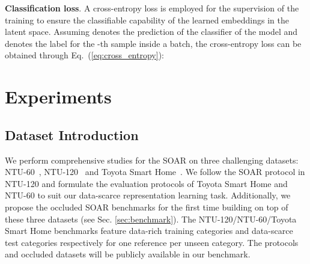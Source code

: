 \documentclass[lettersize,journal]{IEEEtran}
\newcommand{\mypar}[1]{\vspace{0.1cm}\noindent\textbf{#1}.}
\begin{document}
\mypar{Classification loss}
A cross-entropy loss is employed for the supervision of the training to ensure the classifiable capability of the learned embeddings in the latent space. Assuming  denotes the prediction of the classifier of the model and  denotes the label for the -th sample inside a batch, the cross-entropy loss can be obtained through Eq.~(\ref{eq:cross_entropy}):







 
\section{Experiments}
\subsection{Dataset Introduction}
We perform comprehensive studies for the SOAR on three challenging datasets: NTU-60~\cite{shahroudy2016ntu}, NTU-120~\cite{liu2019ntu} and Toyota Smart Home~\cite{Das_2019_ICCV}.
We follow the SOAR protocol in NTU-120 and formulate the evaluation protocols of Toyota Smart Home and NTU-60 to suit our data-scarce representation learning task. Additionally, we propose the occluded SOAR benchmarks for the first time building on top of these three datasets (see Sec. \ref{sec:benchmark}). The NTU-120/NTU-60/Toyota Smart Home benchmarks feature  data-rich training categories and  data-scarce test categories respectively for one reference per unseen category. The protocols and occluded datasets will be publicly available in our benchmark.
\end{document}
